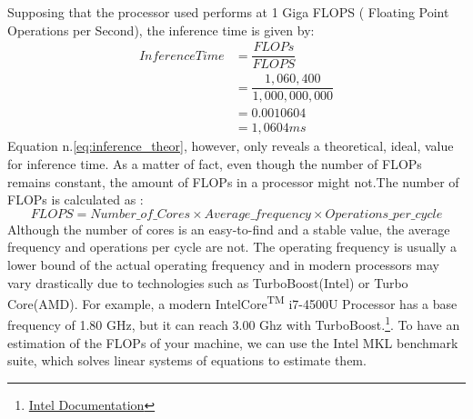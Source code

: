Supposing that the processor used performs at 1 Giga FLOPS ( Floating Point Operations per Second), the inference time is given by:
\begin{equation}
    \begin{aligned}
InferenceTime &= \dfrac{FLOPs}{FLOPS} \\
          &= \dfrac{1,060,400}{1,000,000,000}\\
          &= 0.0010604\\
          &= 1,0604 ms
    \end{aligned}
    \label{eq:inference_theor}
\end{equation}
Equation n.\ref{eq:inference_theor}, however, only reveals a theoretical, ideal, value for inference time. As a matter of fact, even though the number of FLOPs remains constant, the amount of FLOPs in a processor might not.The number of FLOPs is calculated as :
\begin{equation}
FLOPS = Number\_of\_Cores \times Average\_frequency \times Operations\_per\_cycle
\end{equation}
Although the number of cores is an easy-to-find and a stable value, the average frequency and operations per cycle are not. The operating frequency is usually a lower bound of the actual operating frequency and in modern processors may vary drastically due to technologies such as TurboBoost(Intel) or Turbo Core(AMD). For example, a modern Intel\textregistered Core\textsuperscript{TM}  i7-4500U Processor has a base frequency of 1.80 GHz, but it can reach 3.00 Ghz with TurboBoost.\footnote{
\href{https://ark.intel.com/content/www/us/en/ark/products/75460/intel-core-i74500u-processor-4m-cache-up-to-3-00-ghz.html}{Intel Documentation}}. 
To have an estimation of the FLOPs of your machine, we can use the Intel MKL benchmark suite, which solves linear systems of equations to estimate them. \cite{intel_bench_suite}

